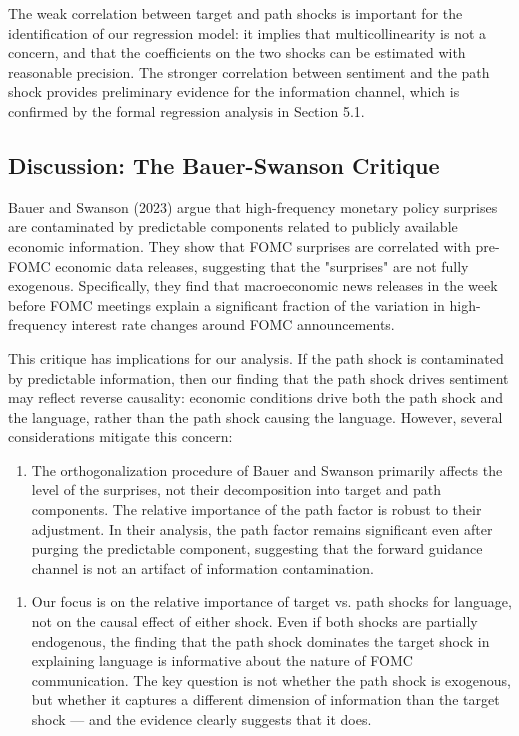 The weak correlation between target and path shocks is important for the identification of our regression model: it implies that multicollinearity is not a concern, and that the coefficients on the two shocks can be estimated with reasonable precision. The stronger correlation between sentiment and the path shock provides preliminary evidence for the information channel, which is confirmed by the formal regression analysis in Section 5.1.

\subsection{Discussion: The Bauer-Swanson Critique}

Bauer and Swanson (2023) argue that high-frequency monetary policy surprises are contaminated by predictable components related to publicly available economic information. They show that FOMC surprises are correlated with pre-FOMC economic data releases, suggesting that the "surprises" are not fully exogenous. Specifically, they find that macroeconomic news releases in the week before FOMC meetings explain a significant fraction of the variation in high-frequency interest rate changes around FOMC announcements.

This critique has implications for our analysis. If the path shock is contaminated by predictable information, then our finding that the path shock drives sentiment may reflect reverse causality: economic conditions drive both the path shock and the language, rather than the path shock causing the language. However, several considerations mitigate this concern:

\begin{enumerate}
\item The orthogonalization procedure of Bauer and Swanson primarily affects the level of the surprises, not their decomposition into target and path components. The relative importance of the path factor is robust to their adjustment. In their analysis, the path factor remains significant even after purging the predictable component, suggesting that the forward guidance channel is not an artifact of information contamination.
\end{enumerate}

\begin{enumerate}
\item Our focus is on the relative importance of target vs. path shocks for language, not on the causal effect of either shock. Even if both shocks are partially endogenous, the finding that the path shock dominates the target shock in explaining language is informative about the nature of FOMC communication. The key question is not whether the path shock is exogenous, but whether it captures a different dimension of information than the target shock --- and the evidence clearly suggests that it does.
\end{enumerate}

